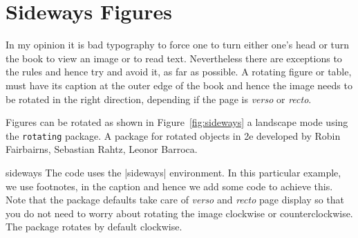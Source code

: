 \section{Sideways Figures}

In my opinion it is bad typography to force one to turn either one's head or turn the book to view an image or to read text. Nevertheless there are exceptions to the rules and hence try and avoid it, as far as possible. A rotating figure or table, must have its caption at the outer edge of the book and hence the image needs to be rotated in the right direction, depending if the page is \textit{verso} or \textit{recto}.
 
Figures can be rotated as shown in Figure~\ref{fig:sideways}  a landscape mode using the \texttt{rotating} package. A package for rotated objects in \latex2e developed by
Robin Fairbairns, Sebastian Rahtz, Leonor Barroca.

\begin{environment}{sideways}
The code uses the |sideways| environment. In this particular example, we use footnotes, in the caption and hence we add some code to achieve this.  Note that the package defaults take care of \textit{verso} and \textit{recto} page display so that you do not need to   worry about rotating the image clockwise or counterclockwise. The package rotates by default clockwise.
\end{environment}

